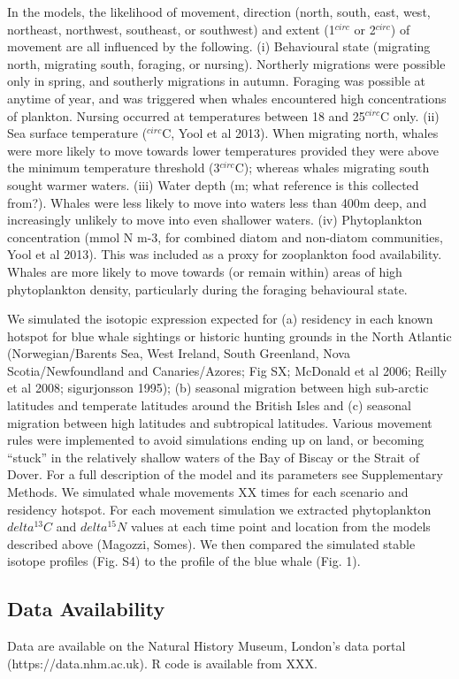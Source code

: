 \documentclass[a4paper,12pt]{article}
\begin{document}
In the models, the likelihood of movement, direction (north, south, east, west, northeast, northwest, southeast, or southwest) and extent (1$^{circ}$ or 2$^{circ}$) of movement are all influenced by the following. 
(i) Behavioural state (migrating north, migrating south, foraging, or nursing). 
Northerly migrations were possible only in spring, and southerly migrations in autumn. Foraging was possible at anytime of year, and was triggered when whales encountered high concentrations of plankton. Nursing occurred at temperatures between 18 and 25$^{circ}$C only. 
(ii) Sea surface temperature ($^{circ}$C, Yool et al 2013). 
When migrating north, whales were more likely to move towards lower temperatures provided they were above the minimum temperature threshold (3$^{circ}$C); whereas whales migrating south sought warmer waters. 
(iii) Water depth (m; what reference is this collected from?). 
Whales were less likely to move into waters less than 400m deep, and increasingly unlikely to move into even shallower waters. 
(iv) Phytoplankton concentration (mmol N m-3, for combined diatom and non-diatom communities, Yool et al 2013). 
This was included as a proxy for zooplankton food availability. 
Whales are more likely to move towards (or remain within) areas of high phytoplankton density, particularly during the foraging behavioural state. 
 
We simulated the isotopic expression expected for (a) residency in each known hotspot for blue whale sightings or historic hunting grounds in the North Atlantic (Norwegian/Barents Sea, West Ireland, South Greenland, Nova Scotia/Newfoundland and Canaries/Azores; Fig SX; McDonald et al 2006; Reilly et al 2008; sigurjonsson 1995); (b) seasonal migration between high sub-arctic latitudes and temperate latitudes around the British Isles and (c) seasonal migration between high latitudes and subtropical latitudes. 
Various movement rules were implemented to avoid simulations ending up on land, or becoming “stuck” in the relatively shallow waters of the Bay of Biscay or the Strait of Dover. 
For a full description of the model and its parameters see Supplementary Methods. We simulated whale movements XX times for each scenario and residency hotspot. 
For each movement simulation we extracted phytoplankton $delta^13C$ and $delta^15N$ values at each time point and location from the models described above (Magozzi, Somes). 
We then compared the simulated stable isotope profiles (Fig. S4) to the profile of the blue whale (Fig. 1).
 
\subsection{Data Availability}
Data are available on the Natural History Museum, London's data portal (https://data.nhm.ac.uk). 
R code is available from XXX.
\end{document}
